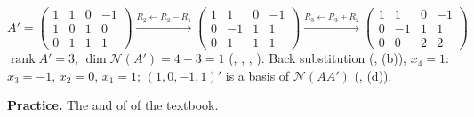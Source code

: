 \documentclass[12pt]{article}
\DeclareMathOperator{\rank}{rank}
\theoremstyle{definition}
\begin{document}
\begin{board}[\(\lambda=0\): \(\mathcal N(AA')=\mathcal N(A')\) (\lec{4}, \lit{Theorem~16}(a) with \(A'\)); reduce \(A'\):]
\[
A'=\begin{pmatrix}1&1&0&-1\\1&0&1&0\\0&1&1&1\end{pmatrix}
\xrightarrow{R_2\leftarrow R_2-R_1}
\begin{pmatrix}1&1&0&-1\\0&-1&1&1\\0&1&1&1\end{pmatrix}
\xrightarrow{R_3\leftarrow R_3+R_2}
\begin{pmatrix}1&1&0&-1\\0&-1&1&1\\0&0&2&2\end{pmatrix}
\]
\(\rank A'=3\), \(\dim\mathcal N(A')=4-3=1\) (, , , ). Back substitution (,
(b)), \(x_4=1\): \(x_3=-1\), \(x_2=0\), \(x_1=1\); \((1,0,-1,1)'\) is a basis of \(\mathcal N(AA')\) (,
(d)).
\end{board}

\bigskip
\textbf{Practice.} The  and  of  of the textbook.
\end{document}
